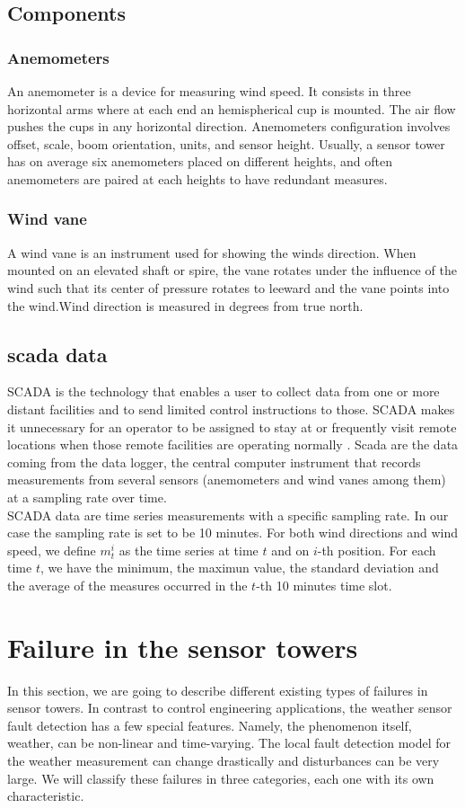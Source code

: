 \documentclass[journal]{IEEEtran}
\begin{document}
\subsection{Components}
\subsubsection{Anemometers}
An anemometer is a device for measuring wind speed. It consists in three horizontal arms where at each end an hemispherical cup is mounted. The air flow pushes the cups in any horizontal direction. Anemometers configuration involves offset, scale, boom orientation, units, and sensor height. Usually, a sensor tower has on average six anemometers placed on different heights, and often anemometers are paired at each heights to have redundant measures.\cite{}
\subsubsection{Wind vane}
A wind vane is an instrument used for showing the winds direction. When mounted on an elevated shaft or spire, the vane rotates under the influence of the wind such that its center of pressure rotates to leeward and the vane points into the wind.Wind direction is measured in degrees from true north.\cite{sayigh2012comprehensive}

\subsection{scada data}\label{subsec:scadaData}
SCADA is the technology that enables a user to collect data from one or more distant facilities and to send limited control instructions to those. SCADA makes it unnecessary for an operator to be assigned to stay at or frequently visit remote locations when those remote facilities are operating normally \cite{}.
Scada are the data coming from the data logger, the central computer instrument that records measurements from several sensors (anemometers and wind vanes among them) at a sampling rate over time.\\
SCADA data are time series measurements with a specific sampling rate. In our case the sampling rate is set to be 10 minutes.
For both wind directions and wind speed, we define $m_t^i$ as the time series at time $t$ and on $i$-th position. For each time $t$, we have the minimum, the maximun value, the standard deviation and the average of the measures occurred in the $t$-th 10 minutes time slot.


\section{Failure in the sensor towers}\label{sec:failures}
In this section, we are going to describe different existing types of failures in sensor towers. In contrast to control engineering applications, the weather sensor fault detection has a few special features. Namely, the phenomenon itself, weather, can be non-linear and time-varying. The local fault detection model for the weather measurement can change drastically and disturbances can be very large. We will classify these failures in three categories, each one with its own characteristic.
\end{document}
